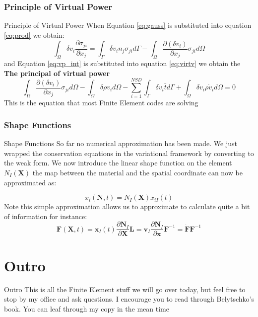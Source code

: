 \documentclass{beamer}
\begin{document}
\subsubsection{Principle of Virtual Power}
\begin{frame}{Principle of Virtual Power}
	When Equation \ref{eq:gauss} is substituted into equation \ref{eq:prod} we obtain:
	\begin{equation}
	\int_{\Omega}\delta v_{i}\frac{\partial \sigma_{ji}}{\partial x_{j}}=
	\int_{\Gamma}\delta v_{i} n_{j}\sigma_{ji}d\Gamma-
	\int_{\Omega}\frac{\partial (\delta v_{i})}{\partial x_{j}}\sigma_{ji}d\Omega
	\label{eq:vp_int}
	\end{equation}
	and Equation \ref{eq:vp_int} is substituted into equation \ref{eq:virtv} we obtain the \textbf{The principal of virtual power}
   \begin{equation}
	   \int_{\Omega}\frac{\partial (\delta v_{i})}{\partial x_{j}}\sigma_{ji}d\Omega-
	   \int_{\Omega}\delta \rho v_{i}d\Omega-
	   \sum_{i=1}^{NSD}\int_{\Gamma}\delta v_{i}\bar{t}d\Gamma+
	   \int_{\Omega}\delta v_{i}\rho\dot{v}_{i}d\Omega=0
   \end{equation}
   This is the equation that most Finite Element codes are solving
\end{frame}

\subsubsection{Shape Functions}
\begin{frame}{Shape Functions}
	So far no numerical approximation has been made. We just wrapped the conservation equations
	in the variational framework by converting to the weak form. 
	We now introduce the linear shape function on the element $N_{I}(\bm{X})$ the map between the 
	material and the spatial coordinate can now be approximated as:
	
	\begin{equation}
		x_{i}(\bm{N},t)=N_{I}(\bm{X})x_{iI}(t)
	\end{equation}
	Note this simple approximation allows us to approximate to calculate quite a bit of information for instance:
	\begin{subequations}
		\begin{equation}
			\bm{F}(\bm{X},t)=\bm{x}_{I}(t)\frac{\partial \bm{N}_{I}}{\partial \bm{X}}
		\end{equation}
		\begin{equation}
			\bm{L}=\bm{v}_{I}\frac{\partial \bm{N}_{I} }{\partial \bm{x}}\bm{F}^{-1}=
			\dot{\bm{F}}\bm{F}^{-1}
		\end{equation}
	\end{subequations}
\end{frame}
\section{Outro}
\begin{frame}{Outro}
	This is all the Finite Element stuff we will go over today, but feel free to stop by my office and ask questions. I encourage you to read through Belytschko's book. You can leaf through my copy in the mean time
\end{frame}
\end{document}

